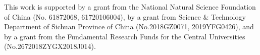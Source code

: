 \documentclass{article}
\begin{document}
\begin{ack}
This work is supported by a grant from the National Natural Science Foundation of China (No. 61872068, 61720106004), by a grant from Science \& Technology Department of Sichuan Province of China (No.2018GZ0071, 2019YFG0426), and by a grant from the Fundamental Research Funds for the Central Universities (No.2672018ZYGX2018J014).

\end{ack}



\small


\end{document}
